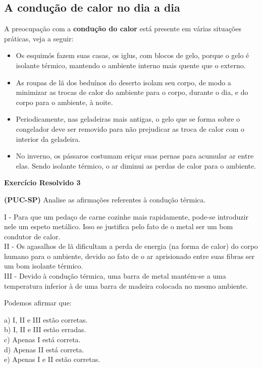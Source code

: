 \documentclass[12pt,twoside]{article}
\begin{document}
\hypertarget{x-a-condução-de-calor-no-dia-a-dia}{\subsection{A condução de calor no dia a dia}}
A preocupação com a \textbf{condução do calor} está presente em várias situações práticas, veja a seguir:


\begin{itemize}

\item Os esquimós fazem suas casas, os iglus, com blocos de gelo, porque o gelo é isolante térmico, mantendo o ambiente interno mais quente que o externo.

\item As roupas de lã dos beduínos do deserto isolam seu corpo, de modo a minimizar as trocas de calor do ambiente para o corpo, durante o dia, e do corpo para o ambiente, à noite.

\item Periodicamente, nas geladeiras mais antigas, o gelo que se forma sobre o congelador deve ser removido para não prejudicar as troca de calor com o interior da geladeira.

\item No inverno, os pássaros costumam eriçar suas pernas para acumular ar entre elas. Sendo isolante térmico, o ar diminui as perdas de calor para o ambiente.

\end{itemize}


\textbf{Exercício Resolvido 3}


\textbf{(PUC-SP)} Analise as afirmações referentes à condução térmica.


I - Para que um pedaço de carne cozinhe mais rapidamente, pode-se introduzir nele um espeto metálico. Isso se justifica pelo fato de o metal ser um bom condutor de calor. \\
II - Os agasalhos de lã dificultam a perda de energia (na forma de calor) do corpo humano para o ambiente, devido ao fato de o ar aprisionado entre suas fibras ser um bom isolante térmico. \\
III - Devido à condução térmica, uma barra de metal mantém-se a uma temperatura inferior à de uma barra de madeira colocada no mesmo ambiente.


Podemos afirmar que:


a) I, II e III estão corretas. \\
b) I, II e III estão erradas. \\
c) Apenas I está correta. \\
d) Apenas II está correta. \\
e) Apenas I e II estão corretas.
\end{document}
